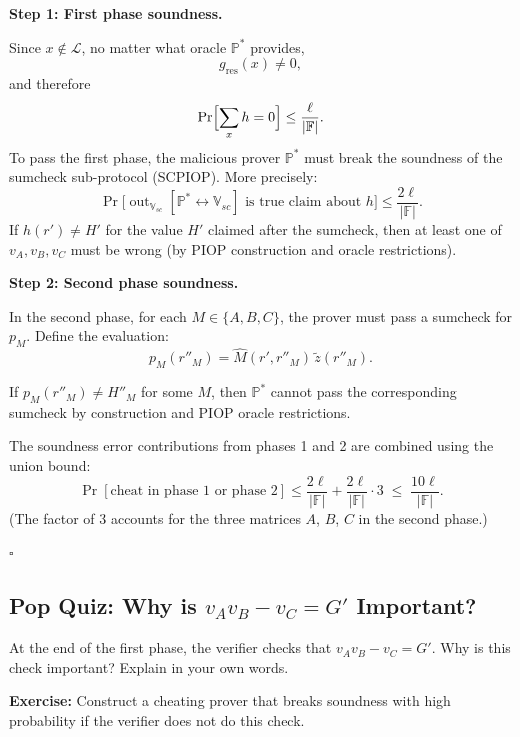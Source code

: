 \documentclass[11pt]{article}
\theoremstyle{plain}
\theoremstyle{definition}
\newcommand{\F}{\mathbb{F}}
\DeclareMathOperator{\out}{out}
\begin{document}
\medskip
\noindent\textbf{Step 1: First phase soundness.}

Since $x \notin \mathcal{L}$, no matter what oracle $\mathbb{P}^*$ provides,
\[
  g_{\mathrm{res}}(x) \neq 0,
\]
and therefore
\[
  \Pr\Bigl[\sum_x h = 0\Bigr] \leq \frac{\ell}{|\F|}.
\]
To pass the first phase, the malicious prover $\mathbb{P}^*$ must break the soundness of
the sumcheck sub-protocol (SCPIOP).  More precisely:
\[
  \Pr\bigl[\out_{\mathbb{V}_{sc}}[\mathbb{P}^* \leftrightarrow \mathbb{V}_{sc}]
  \text{ is true claim about }h\bigr]
  \leq \frac{2\ell}{|\F|}.
\]
If $h(r') \neq H'$ for the value $H'$ claimed after the sumcheck, then at least one of
$v_A, v_B, v_C$ must be wrong (by PIOP construction and oracle restrictions).

\medskip
\noindent\textbf{Step 2: Second phase soundness.}

In the second phase, for each $M \in \{A, B, C\}$, the prover must pass a sumcheck for
$p_M$.  Define the evaluation:
\[
  p_M(r''_M) = \widehat{M}(r', r''_M)\,\tilde{z}(r''_M).
\]

\begin{claimbox}
  If $p_M(r''_M) \neq H''_M$ for some $M$, then $\mathbb{P}^*$ cannot pass the
  corresponding sumcheck by construction and PIOP oracle restrictions.
\end{claimbox}

The soundness error contributions from phases 1 and 2 are combined using the union bound:
\[
  \Pr[\text{cheat in phase 1 or phase 2}]
  \leq \frac{2\ell}{|\F|} + \frac{2\ell}{|\F|} \cdot 3
  \;\leq\; \frac{10\ell}{|\F|}.
\]
(The factor of 3 accounts for the three matrices $A$, $B$, $C$ in the second phase.)

\hfill $\square$

\subsection{Pop Quiz: Why is $v_A v_B - v_C = G'$ Important?}

\begin{tcolorbox}[colback=yellow!10, colframe=black!40, title=Pop Quiz]
  At the end of the first phase, the verifier checks that $v_A v_B - v_C = G'$.
  Why is this check important? Explain in your own words.

  \medskip
  \textbf{Exercise:} Construct a cheating prover that breaks soundness with high
  probability if the verifier does not do this check.
\end{tcolorbox}
\end{document}
